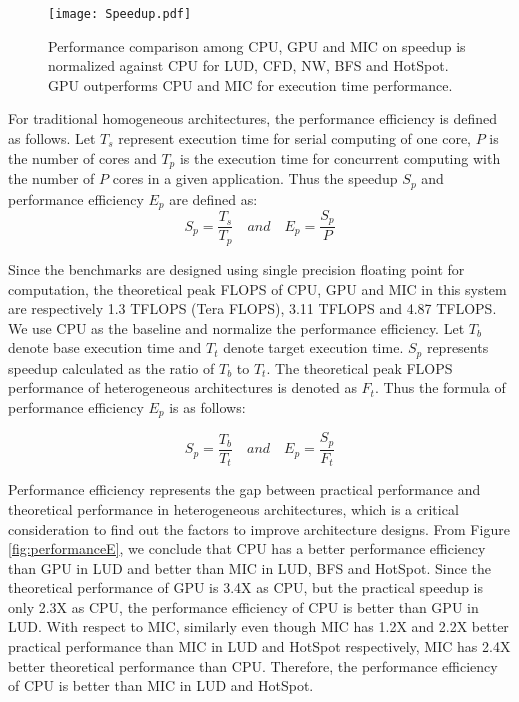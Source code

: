
    \begin{figure}[h!]
  \centering
  \begin{minipage}{0.5\textwidth}
    \centering
   \centering
     \texttt{[image: Speedup.pdf]}    
\caption{Performance comparison among CPU, GPU and MIC on speedup is normalized against CPU for LUD, CFD, NW, BFS and HotSpot. GPU outperforms CPU and MIC for execution time performance.}

\label{fig:speedup}
\end{minipage}%
\end{figure}

  
  For traditional homogeneous architectures, the performance efficiency is defined as follows. Let $T_{s}$ represent execution time for serial computing of one core, $P$ is the number of cores and $T_{p}$ is the execution time for concurrent computing with the number of $P$ cores in a given application. Thus the speedup $S_{p}$ and performance efficiency $E_{p}$ are defined as:
\begin{equation}\label{equ:old_speedup}
	{S_{p}} = \frac{T_{s}}{T_{p}} \quad and \quad {E_{p}} = \frac{S_{p}}{P}
\end{equation}
  
 Since the benchmarks are designed using single precision floating point for computation, the theoretical peak FLOPS of CPU, GPU and MIC in this system are respectively 1.3 TFLOPS (Tera FLOPS), 3.11 TFLOPS and 4.87 TFLOPS. We use CPU as the baseline and normalize the performance efficiency. Let $T_{b}$ denote base execution time and $T_{t}$ denote target execution time. $S_{p}$ represents speedup calculated as the ratio of $T_{b}$ to $T_{t}$. The theoretical peak FLOPS performance of heterogeneous architectures is denoted as $F_{t}$. Thus the formula of performance efficiency $E_{p}$ is as follows:

\begin{equation}\label{equ:new_speedup}
	{S_{p}} = \frac{T_{b}}{T_{t}} \quad and \quad {E_{p}} = \frac{S_{p}}{F_{t}}
\end{equation}
  
Performance efficiency represents the gap between practical performance and theoretical performance in heterogeneous architectures, which is a critical consideration to find out the factors to improve architecture designs. From Figure \ref{fig:performanceE}, we conclude that CPU has a better performance efficiency than GPU in LUD and better than MIC in LUD, BFS and HotSpot. Since the theoretical performance of GPU is 3.4X as CPU, but the practical speedup is only 2.3X as CPU, the performance efficiency of CPU is better than GPU in LUD. With respect to MIC, similarly even though MIC has 1.2X and 2.2X better practical performance than MIC in LUD and HotSpot respectively, MIC has 2.4X better theoretical performance than CPU. Therefore, the performance efficiency of CPU is better than MIC in LUD and HotSpot.

